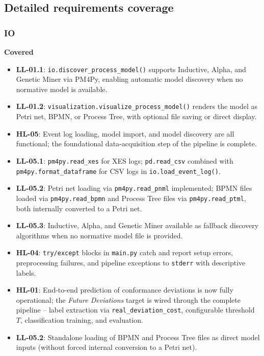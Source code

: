 \documentclass[12pt,a4paper]{article}
\begin{document}
\subsection{Detailed requirements coverage}
\subsubsection{IO}
\textbf{Covered}
\begin{itemize}
    \item \textbf{LL-01.1}: \texttt{io.discover\_process\_model()} supports Inductive, Alpha, and Genetic Miner via PM4Py, enabling automatic model discovery when no normative model is available.
    \item \textbf{LL-01.2}: \texttt{visualization.visualize\_process\_model()} renders the model as Petri net, BPMN, or Process Tree, with optional file saving or direct display.
    \item \textbf{HL-05}: Event log loading, model import, and model discovery are all functional; the foundational data-acquisition step of the pipeline is complete.
    \item \textbf{LL-05.1}: \texttt{pm4py.read\_xes} for XES logs; \texttt{pd.read\_csv} combined with \texttt{pm4py.format\_dataframe} for CSV logs in \texttt{io.load\_event\_log()}.
    \item \textbf{LL-05.2}: Petri net loading via \texttt{pm4py.read\_pnml} implemented; BPMN files loaded via \texttt{pm4py.read\_bpmn} and Process Tree files via \texttt{pm4py.read\_ptml}, both internally converted to a Petri net.
    \item \textbf{LL-05.3}: Inductive, Alpha, and Genetic Miner available as fallback discovery algorithms when no normative model file is provided.
    \item \textbf{HL-04}: \texttt{try/except} blocks in \texttt{main.py} catch and report setup errors, preprocessing failures, and pipeline exceptions to \texttt{stderr} with descriptive labels.
    \item \textbf{HL-01}: End-to-end prediction of conformance deviations is now fully operational; the \textit{Future Deviations} target is wired through the complete pipeline -- label extraction via \texttt{real\_deviation\_cost}, configurable threshold $T$, classification training, and evaluation.
    \item \textbf{LL-05.2}: Standalone loading of BPMN and Process Tree files as direct model inputs (without forced internal conversion to a Petri net).
\end{itemize}
\end{document}
